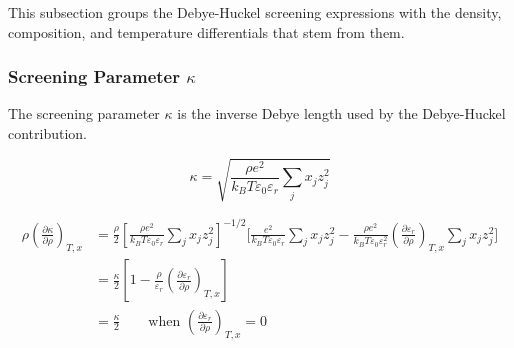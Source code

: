 \documentclass[12pt, letterpaper]{article}
\begin{document}
This subsection groups the Debye-Huckel screening expressions with the density, composition, and temperature differentials that stem from them.

\subsubsection{Screening Parameter \(\kappa\)}

The screening parameter \(\kappa\) is the inverse Debye length used by the Debye-Huckel contribution.

\begin{equation}
    \kappa=\sqrt{\frac{\rho e^{2}}{k_{B}T\varepsilon_{0}\varepsilon_{r}}\sum_{j}x_{j}z_{j}^{2}}
    \label{eq:kappa_dh}
\end{equation}


\begin{equation}
    \begin{aligned}
        \rho\left(\frac{\partial \kappa}{\partial \rho}\right)_{T,x}
        &=
        \frac{\rho}{2}
        \left[
            \frac{\rho e^{2}}{k_{B}T\varepsilon_{0}\varepsilon_{r}}
            \sum_{j}x_{j}z_{j}^{2}
        \right]^{-1/2}
        \Biggl[
            \frac{e^{2}}{k_{B}T\varepsilon_{0}\varepsilon_{r}}\sum_{j}x_{j}z_{j}^{2}
            -
            \frac{\rho e^{2}}{k_{B}T\varepsilon_{0}\varepsilon_{r}^{2}}
            \left(\frac{\partial \varepsilon_{r}}{\partial \rho}\right)_{T,x}
            \sum_{j}x_{j}z_{j}^{2}
        \Biggr]
        \\
        &=
        \frac{\kappa}{2}
        \left[
            1
            -
            \frac{\rho}{\varepsilon_{r}}
            \left(\frac{\partial \varepsilon_{r}}{\partial \rho}\right)_{T,x}
        \right]
        \\
        &=
        \frac{\kappa}{2}
        \qquad
        \text{when }\left(\frac{\partial \varepsilon_{r}}{\partial \rho}\right)_{T,x}=0
    \end{aligned}
    \label{eq:dkappa_dh_drho}
\end{equation}
\end{document}

